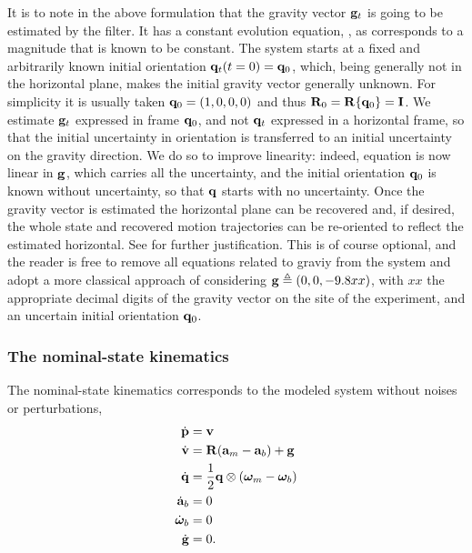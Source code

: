 \bigskip
It is to note in the above formulation that the gravity vector ${\bf g}_t$ is going to be estimated by the filter. 
It has a constant evolution equation, , as corresponds to a magnitude that is known to be constant. 
The system starts at a fixed and arbitrarily known initial orientation ${\bf q}_t(t=0)={\bf q}_0$, which, being generally not in the horizontal plane, makes the initial gravity vector generally unknown. 
For simplicity it is usually taken ${\bf q}_0=(1, 0, 0, 0)$ and thus ${\bf R}_0={\bf R}\{{\bf q}_0\}={\bf I}$. 
We estimate ${\bf g}_t$ expressed in frame ${\bf q}_0$, and not ${\bf q}_t$ expressed in a horizontal frame, so that the initial uncertainty in orientation is transferred to an initial uncertainty on the gravity direction. 
We do so to improve linearity: indeed, equation  is now linear in ${\bf g}$, which carries all the uncertainty, and the initial orientation ${\bf q}_0$ is known without uncertainty, so that ${\bf q}$ starts with no uncertainty. 
Once the gravity vector is estimated the horizontal plane can be recovered and, if desired, the whole state and recovered motion trajectories can be re-oriented to reflect the estimated horizontal. 
See \citep{LUPTON-09} for further justification. 
This is of course optional, and the reader is free to remove all equations related to graviy from the system and adopt a more classical approach of considering ${\bf g}\triangleq(0,0,-9.8xx)$, with $xx$ the appropriate decimal digits of the gravity vector on the site of the experiment, and an uncertain initial orientation ${\bf q}_0$.



\subsubsection{The nominal-state kinematics}

The nominal-state kinematics corresponds to the modeled system without noises or perturbations,
%
\begin{subequations}
%
\begin{align}
\dot{{\bf p}} &= {\bf v} \label{equ:pdot}\\
\dot{{\bf v}} &= {\bf R}({\bf a}_m - {\bf a}_b) + {\bf g} \label{equ:vdot}\\
\dot{{\bf q}} &= \frac{1}{2}{\bf q}\otimes({\bm \omega}_m - {\bm \omega}_b) \\
\dot{{\bf a}}_b &= 0 \\
\dot{{\bm \omega}}_b &= 0 \\
\dot{{\bf g}} &= 0 .
\end{align}%
\end{subequations}
%




